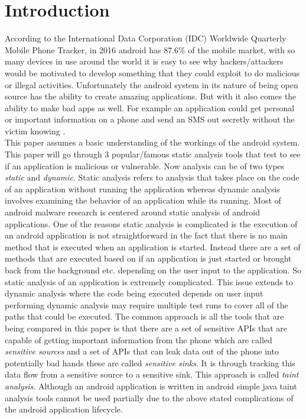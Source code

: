 \documentclass[journal]{IEEEtran}
\begin{document}
\IEEEpeerreviewmaketitle

\section{Introduction}
	According to the  International Data Corporation (IDC) Worldwide Quarterly Mobile Phone Tracker, in 2016 android has 87.6\% of the mobile market, with so many devices in use around the world it is easy to see why hackers/attackers would be motivated to develop something that they could exploit to do malicious or illegal activities. Unfortunately the android system in its nature of being open source has the ability to create amazing applications. But with it also comes the ability to make bad apps as well.  For example an application could get personal or important information on a phone and send an SMS out secretly without the victim knowing .\\
	This paper assumes a basic understanding of the workings of the android system.\\ 
 	This paper will go through 3 popular/famous static analysis tools that test to see if an application is malicious or vulnerable. Now analysis can be of two types \textit{static} and \textit{dynamic}. Static analysis refers to analysis that takes place on the code of an application without running the application whereas dynamic analysis involves examining the behavior of an application while its running. Most of android malware research is centered around static analysis of android applications. One of the reasons static analysis is complicated is the execution of an android application is not straightforward in the fact that there is no main method that is executed when an application is started. Instead there are a set of methods that are executed based on if an application is just started or brought back from the background etc. depending on the user input to the application. So static analysis of an application is extremely complicated. This issue extends to dynamic analysis where the code being executed depends on user input performing dynamic analysis may require multiple test runs to cover all of the paths that could be executed. The common approach is all the tools that are being compared in this paper is that there are a set of sensitive APIs that are capable of getting important information from the phone which are called \textit{sensitive sources} and a set of APIs that can leak data out of the phone into potentially bad hands these are called \textit{sensitive sinks}. It is through tracking this data flow from a sensitive source to a sensitive sink. This approach is called \textit{taint analysis}. Although an android application is written in android simple java taint analysis tools cannot be used partially due to the above stated complications of the android application lifecycle.\\     
 	
\end{document}
